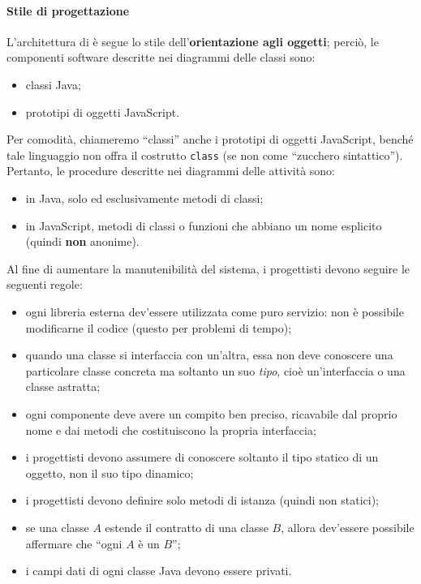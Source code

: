 	\paragraph{Stile di progettazione} L'architettura di \proj{} è segue lo stile dell'\textbf{orientazione agli oggetti}; perciò, le componenti software descritte nei diagrammi delle classi sono:
	\begin{itemize}
		\item classi Java;
		\item prototipi di oggetti JavaScript.
	\end{itemize}
	Per comodità, chiameremo “classi” anche i prototipi di oggetti JavaScript, benché tale linguaggio non offra il costrutto \texttt{class} (se non come “zucchero sintattico”). Pertanto, le procedure descritte nei diagrammi delle attività sono:
	\begin{itemize}
		\item in Java, solo ed esclusivamente metodi di classi;
		\item in JavaScript, metodi di classi o funzioni che abbiano un nome esplicito (quindi \textbf{non} anonime).
	\end{itemize}
	Al fine di aumentare la manutenibilità del sistema, i progettisti devono seguire le seguenti regole:
	\begin{itemize}
		\item ogni libreria esterna dev'essere utilizzata come puro servizio: non è possibile modificarne il codice (questo per problemi di tempo);
		\item quando una classe si interfaccia con un'altra, essa non deve conoscere una particolare classe concreta ma soltanto un suo \emph{tipo}, cioè un'interfaccia o una classe astratta;
		\item ogni componente deve avere un compito ben preciso, ricavabile dal proprio nome e dai metodi che costituiscono la propria interfaccia;
		\item i progettisti devono assumere di conoscere soltanto il tipo statico di un oggetto, non il suo tipo dinamico;
		\item i progettisti devono definire solo metodi di istanza (quindi non statici);
		\item se una classe $A$ estende il contratto di una classe $B$, allora dev'essere possibile affermare che “ogni $A$ è un $B$”;
		\item i campi dati di ogni classe Java devono essere privati.
	\end{itemize}

